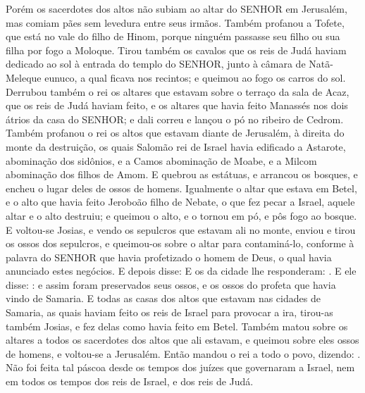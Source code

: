 {  Porém os sacerdotes dos altos não subiam ao altar do SENHOR em Jerusalém, mas comiam pães sem levedura entre seus irmãos.
  Também profanou a Tofete, que está no vale do filho de Hinom, porque ninguém passasse seu filho ou sua filha por fogo a Moloque.
  Tirou também os cavalos que os reis de Judá haviam dedicado ao sol à entrada do templo do SENHOR, junto à câmara de Natã-Meleque eunuco, a qual ficava nos recintos; e queimou ao fogo os carros do sol.
  Derrubou também o rei os altares que estavam sobre o terraço da sala de Acaz, que os reis de Judá haviam feito, e os altares que havia feito Manassés nos dois átrios da casa do SENHOR; e dali correu e lançou o pó no ribeiro de Cedrom.
  Também profanou o rei os altos que estavam diante de Jerusalém, à direita do monte da destruição, os quais Salomão rei de Israel havia edificado a Astarote, abominação dos sidônios, e a Camos abominação de Moabe, e a Milcom abominação dos filhos de Amom.
  E quebrou as estátuas, e arrancou os bosques, e encheu o lugar deles de ossos de homens.
  Igualmente o altar que estava em Betel, e o alto que havia feito Jeroboão filho de Nebate, o que fez pecar a Israel, aquele altar e o alto destruiu; e queimou o alto, e o tornou em pó, e pôs fogo ao bosque.
  E voltou-se Josias, e vendo os sepulcros que estavam ali no monte, enviou e tirou os ossos dos sepulcros, e queimou-os sobre o altar para contaminá-lo, conforme à palavra do SENHOR que havia profetizado o homem de Deus, o qual havia anunciado estes negócios.
  E depois disse:  E os da cidade lhe responderam: .
  E ele disse: : e assim foram preservados seus ossos, e os ossos do profeta que havia vindo de Samaria.
  E todas as casas dos altos que estavam nas cidades de Samaria, as quais haviam feito os reis de Israel para provocar a ira, tirou-as também Josias, e fez delas como havia feito em Betel.
  Também matou sobre os altares a todos os sacerdotes dos altos que ali estavam, e queimou sobre eles ossos de homens, e voltou-se a Jerusalém.
  Então mandou o rei a todo o povo, dizendo: .
  Não foi feita tal páscoa desde os tempos dos juízes que governaram a Israel, nem em todos os tempos dos reis de Israel, e dos reis de Judá.
}
